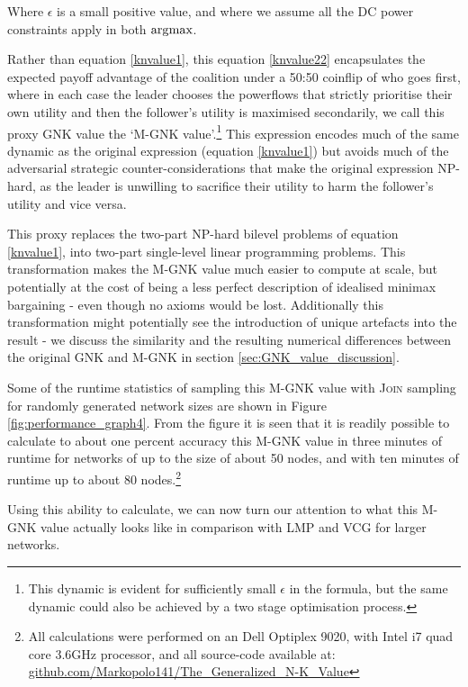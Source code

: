 Where $\epsilon$ is a small positive value, and where we assume all the DC power constraints apply in both $\operatorname*{\arg\!\max}$.

Rather than equation \eqref{knvalue1}, this equation \eqref{knvalue22} encapsulates the expected payoff advantage of the coalition under a 50:50 coinflip of who goes first, where in each case the leader chooses the powerflows that strictly prioritise their own utility and then the follower's utility is maximised secondarily, we call this proxy GNK value the `M-GNK value'.\footnote{This dynamic is evident for sufficiently small $\epsilon$ in the formula, but the same dynamic could also be achieved by a two stage optimisation process.}
This expression encodes much of the same dynamic as the original expression (equation \ref{knvalue1}) but avoids much of the adversarial strategic counter-considerations that make the original expression NP-hard, as the leader is unwilling to sacrifice their utility to harm the follower's utility and vice versa.

This proxy replaces the two-part NP-hard bilevel problems of equation \ref{knvalue1}, into two-part single-level linear programming problems.
This transformation makes the M-GNK value much easier to compute at scale, but potentially at the cost of being a less perfect description of idealised minimax bargaining - even though no axioms would be lost.
Additionally this transformation might potentially see the introduction of unique artefacts into the result - we discuss the similarity and the resulting numerical differences between the original GNK and M-GNK in section \ref{sec:GNK_value_discussion}.

Some of the runtime statistics of sampling this M-GNK value with \textsc{Join} sampling for randomly generated network sizes are shown in Figure \ref{fig:performance_graph4}.
From the figure it is seen that it is readily possible to calculate to about one percent accuracy this M-GNK value in three minutes of runtime for networks of up to the size of about 50 nodes, and with ten minutes of runtime up to about 80 nodes.\footnote{\label{note1} All calculations were performed on an Dell Optiplex 9020, with Intel i7 quad core 3.6GHz processor, and all source-code available at:\\
\href{https://github.com/Markopolo141/The\_Generalized\_N-K\_Value}{github.com/Markopolo141/The\_Generalized\_N-K\_Value}}

Using this ability to calculate, we can now turn our attention to what this M-GNK value actually looks like in comparison with LMP and VCG for larger networks.

